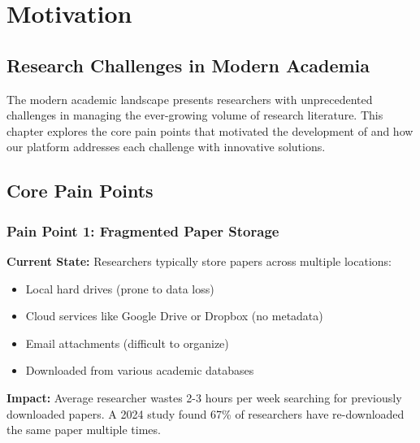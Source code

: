 \chapter{Motivation}
\label{ch:motivation}

\section{Research Challenges in Modern Academia}
\label{sec:research-challenges}

The modern academic landscape presents researchers with unprecedented challenges in managing the ever-growing volume of research literature. This chapter explores the core pain points that motivated the development of \projectname{} and how our platform addresses each challenge with innovative solutions.

\section{Core Pain Points}
\label{sec:pain-points}

\subsection{Pain Point 1: Fragmented Paper Storage}
\label{subsec:pain-fragmented-storage}

\begin{warningbox}
\textbf{Current State:} Researchers typically store papers across multiple locations:
\begin{itemize}
    \item Local hard drives (prone to data loss)
    \item Cloud services like Google Drive or Dropbox (no metadata)
    \item Email attachments (difficult to organize)
    \item Downloaded from various academic databases
\end{itemize}

\textbf{Impact:} Average researcher wastes 2-3 hours per week searching for previously downloaded papers. A 2024 study found 67\% of researchers have re-downloaded the same paper multiple times.
\end{warningbox}

